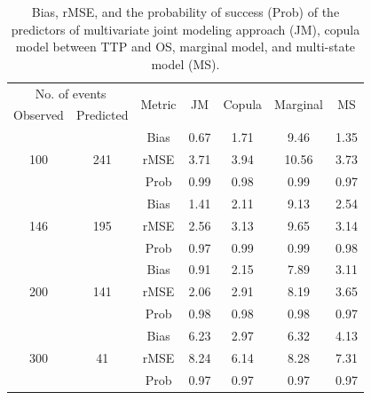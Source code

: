 \documentclass[aoas]{imsart}
\theoremstyle{plain}
\theoremstyle{remark}
\begin{document}
\begin{table}
\caption{Bias, rMSE, and the probability of success (Prob) of the predictors of multivariate joint modeling approach (JM), copula model between TTP and OS, marginal model, and multi-state model (MS). \label{tab:casestudytable}}
\begin{center}
\begin{tabular}{ccccccc}
\hline
\multicolumn{2}{c}{No. of events} & \multirow{2}{*}{Metric} & \multirow{2}{*}{JM} & \multirow{2}{*}{Copula} & \multirow{2}{*}{Marginal} & \multirow{2}{*}{MS}\\ 
Observed & Predicted & & & & & \\\hline
\multirow{3}{*}{100} & \multirow{3}{*}{241} & Bias & 0.67 & 1.71 & 9.46 & 1.35\\
&& rMSE & 3.71 & 3.94 & 10.56 & 3.73 \\
&& Prob & 0.99 & 0.98 & 0.99 & 0.97 \\ \hline
\multirow{3}{*}{146} & \multirow{3}{*}{195} & Bias & 1.41 & 2.11 & 9.13 & 2.54\\
&& rMSE & 2.56 & 3.13 & 9.65 & 3.14 \\
&& Prob & 0.97 & 0.99 & 0.99 & 0.98 \\ \hline
\multirow{3}{*}{200} & \multirow{3}{*}{141} & Bias & 0.91 & 2.15 & 7.89 & 3.11\\
&& rMSE & 2.06 & 2.91 & 8.19 & 3.65 \\ 
&& Prob & 0.98 & 0.98 & 0.98 & 0.97 \\ \hline
\multirow{3}{*}{300} & \multirow{3}{*}{41} & Bias & 6.23 & 2.97 & 6.32 & 4.13  \\
&& rMSE & 8.24 & 6.14 & 8.28 & 7.31  \\ 
&& Prob & 0.97 & 0.97 & 0.97 & 0.97  \\ \hline
\end{tabular}
\end{center}
\end{table}
\end{document}
